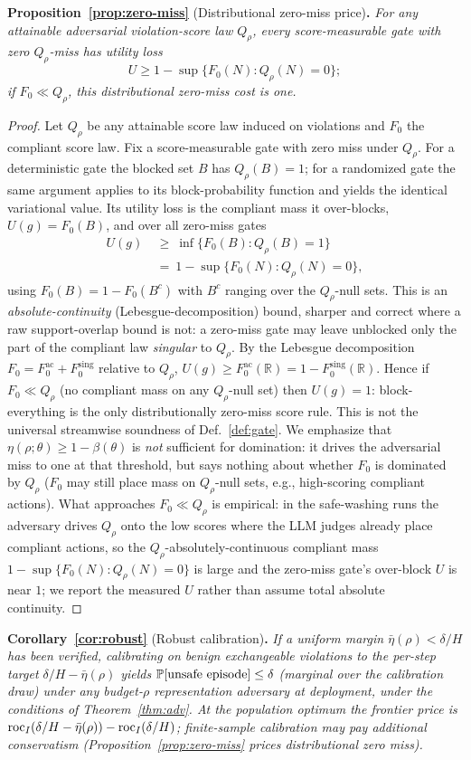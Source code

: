 \medskip
\noindent\textbf{Proposition~\ref{prop:zero-miss}} (Distributional zero-miss price)\textbf{.}
\emph{For any attainable adversarial violation-score law $Q_\rho$, every
score-measurable gate with zero $Q_\rho$-miss has utility loss
\[U\ge1-\sup\{F_0(N):Q_\rho(N)=0\};\]
if $F_0\ll Q_\rho$, this distributional
zero-miss cost is one.}
\begin{proof}
Let $Q_\rho$ be any attainable score law
induced on violations and $F_0$ the compliant score law. Fix a score-measurable
gate with zero miss under $Q_\rho$. For a deterministic gate the blocked set
$B$ has $Q_\rho(B)=1$; for a randomized gate the same argument applies to its
block-probability function and yields the identical variational value. Its utility loss is the
compliant mass it over-blocks, $U(g)=F_0(B)$, and over all zero-miss gates
\begin{align*}
  U(g)\ &\ge\ \inf\{F_0(B):Q_\rho(B)=1\}\\
        &=\ 1-\sup\{F_0(N):Q_\rho(N)=0\},
\end{align*}
using $F_0(B)=1-F_0(B^{c})$ with $B^{c}$ ranging over the $Q_\rho$-null sets. This is an
\emph{absolute-continuity} (Lebesgue-decomposition) bound, sharper and correct where a raw support-overlap
bound is not: a zero-miss gate may leave unblocked only the part of the compliant law
\emph{singular} to $Q_\rho$. By the Lebesgue decomposition $F_0=F_0^{\mathrm{ac}}+F_0^{\mathrm{sing}}$
relative to $Q_\rho$, $U(g)\ge F_0^{\mathrm{ac}}(\mathbb{R})=1-F_0^{\mathrm{sing}}(\mathbb{R})$.
Hence if $F_0\ll Q_\rho$ (no compliant mass on any $Q_\rho$-null set) then $U(g)=1$:
block-everything is the only distributionally zero-miss score rule. This is not
the universal streamwise soundness of Def.~\ref{def:gate}. We emphasize that
$\eta(\rho;\theta)\ge1-\beta(\theta)$ is \emph{not} sufficient for domination:
it drives the adversarial miss to one at that threshold, but says nothing about
whether $F_0$ is dominated by $Q_\rho$ ($F_0$
may still place mass on $Q_\rho$-null sets, e.g., high-scoring compliant actions). What
approaches $F_0\ll Q_\rho$ is empirical: in the safe-washing runs the adversary drives $Q_\rho$
onto the low scores where the LLM judges already place compliant actions, so the $Q_\rho$-absolutely-continuous compliant mass
$1-\sup\{F_0(N):Q_\rho(N)=0\}$ is large and the zero-miss gate's over-block $U$ is near $1$; we
report the measured $U$ rather than assume total absolute continuity.
\end{proof}

\medskip
\noindent\textbf{Corollary~\ref{cor:robust}} (Robust calibration)\textbf{.}
\emph{If a uniform margin $\bar\eta(\rho)<\delta/H$ has been verified, calibrating on
benign exchangeable violations to the per-step target
$\delta/H-\bar\eta(\rho)$ yields $\mathbb{P}[\text{unsafe episode}]\le\delta$ (marginal over the calibration
draw) under any budget-$\rho$ representation adversary at deployment, under the
conditions of Theorem~\ref{thm:adv}. At the population
optimum the frontier price is
$\mathrm{roc}_I(\delta/H-\bar\eta(\rho))-\mathrm{roc}_I(\delta/H)$; finite-sample calibration may pay
additional conservatism (Proposition~\ref{prop:zero-miss} prices distributional zero miss).}

